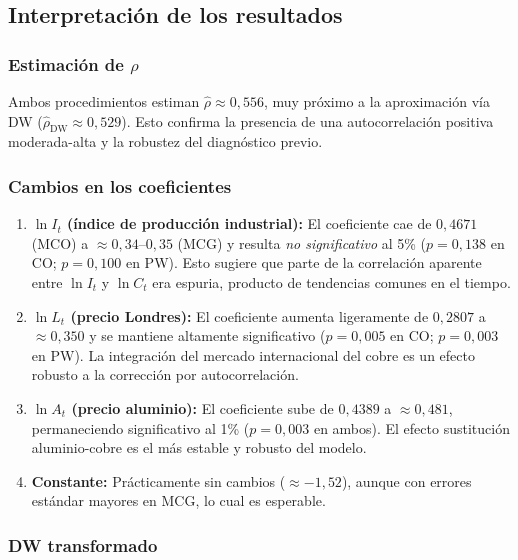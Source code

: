 \documentclass[12pt,a4paper]{article}
\begin{document}
\subsection{Interpretación de los resultados}

\subsubsection*{Estimación de $\rho$}

Ambos procedimientos estiman $\hat\rho \approx 0{,}556$, muy próximo a la
aproximación vía DW ($\hat\rho_{\text{DW}} \approx 0{,}529$). Esto confirma
la presencia de una autocorrelación positiva moderada-alta y la robustez del
diagnóstico previo.

\subsubsection*{Cambios en los coeficientes}

\begin{enumerate}
  \item \textbf{$\ln I_t$ (índice de producción industrial):} El coeficiente
        cae de $0{,}4671$ (MCO) a $\approx 0{,}34$--$0{,}35$ (MCG) y resulta
        \emph{no significativo} al 5\% ($p=0{,}138$ en CO; $p=0{,}100$ en PW).
        Esto sugiere que parte de la correlación aparente entre $\ln I_t$ y
        $\ln C_t$ era espuria, producto de tendencias comunes en el tiempo.

  \item \textbf{$\ln L_t$ (precio Londres):} El coeficiente aumenta
        ligeramente de $0{,}2807$ a $\approx 0{,}350$ y se mantiene
        altamente significativo ($p=0{,}005$ en CO; $p=0{,}003$ en PW).
        La integración del mercado internacional del cobre es un efecto
        robusto a la corrección por autocorrelación.

  \item \textbf{$\ln A_t$ (precio aluminio):} El coeficiente sube de
        $0{,}4389$ a $\approx 0{,}481$, permaneciendo significativo al 1\%
        ($p=0{,}003$ en ambos). El efecto sustitución aluminio-cobre es
        el más estable y robusto del modelo.

  \item \textbf{Constante:} Prácticamente sin cambios ($\approx -1{,}52$),
        aunque con errores estándar mayores en MCG, lo cual es esperable.
\end{enumerate}

\subsubsection*{DW transformado}
\end{document}
